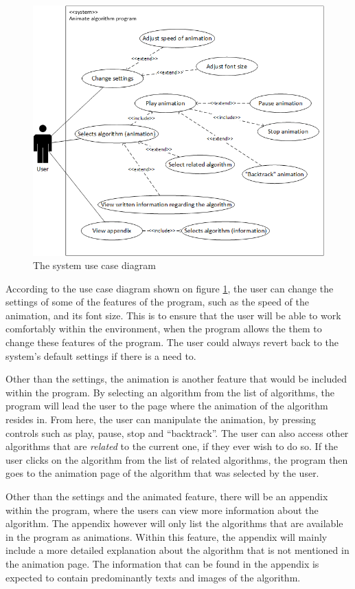 \begin{figure}[H]
\centering
\hspace*{-1cm}
\includegraphics[scale=1]{images/report_images/useCaseDiagram.png}
\caption{The system use case diagram}
\label{useCaseDiagram}
\end{figure}

According to the use case diagram shown on figure \ref{useCaseDiagram}, the user can change the settings of some of the features of the program, such as the speed of the animation, and its font size. This is to ensure that the user will be able to work comfortably within the environment, when the program allows the them to change these features of the program. The user could always revert back to the system's default settings if there is a need to.

Other than the settings, the animation is another feature that would be included within the program. By selecting an algorithm from the list of algorithms, the program will lead the user to the page where the animation of the algorithm resides in. From here, the user can manipulate the animation, by pressing controls such as play, pause, stop and ``backtrack''. The user can also access other algorithms that are \textit{related} to the current one, if they ever wish to do so. If the user clicks on the algorithm from the list of related algorithms, the program then goes to the animation page of the algorithm that was selected by the user.

Other than the settings and the animated feature, there will be an appendix within the program, where the users can view more information about the algorithm. The appendix however will only list the algorithms that are available in the program as animations. Within this feature, the appendix will mainly include a more detailed explanation about the algorithm that is not mentioned in the animation page. The information that can be found in the appendix is expected to contain predominantly texts and images of the algorithm.

